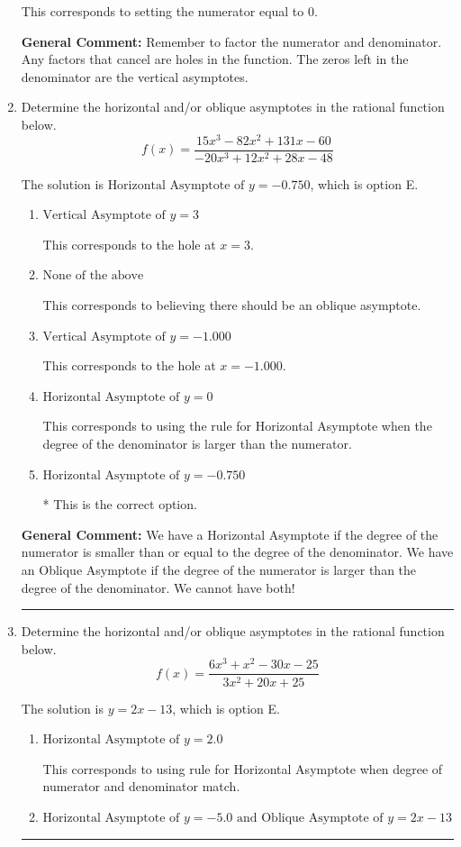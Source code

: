 \documentclass{extbook}[14pt]
\newcommand{\litem}[1]{\item #1

\rule{\textwidth}{0.4pt}}
\begin{document}
\begin{enumerate}
{\begin{enumerate}[label=\Alph*.]
This corresponds to setting the numerator equal to 0.
\end{enumerate}

\textbf{General Comment:} Remember to factor the numerator and denominator. Any factors that cancel are holes in the function. The zeros left in the denominator are the vertical asymptotes.
}
\litem{
Determine the horizontal and/or oblique asymptotes in the rational function below.
\[ f(x) = \frac{15x^{3} -82 x^{2} +131 x -60}{-20x^{3} +12 x^{2} +28 x -48} \]

The solution is \( \text{Horizontal Asymptote of } y = -0.750  \), which is option E.\begin{enumerate}[label=\Alph*.]
\item \( \text{Vertical Asymptote of } y = 3  \)

This corresponds to the hole at $x = 3$.
\item \( \text{None of the above} \)

This corresponds to believing there should be an oblique asymptote.
\item \( \text{Vertical Asymptote of } y = -1.000  \)

This corresponds to the hole at $x = -1.000$.
\item \( \text{Horizontal Asymptote of } y = 0  \)

This corresponds to using the rule for Horizontal Asymptote when the degree of the denominator is larger than the numerator.
\item \( \text{Horizontal Asymptote of } y = -0.750  \)

* This is the correct option.
\end{enumerate}

\textbf{General Comment:} We have a Horizontal Asymptote if the degree of the numerator is smaller than or equal to the degree of the denominator. We have an Oblique Asymptote if the degree of the numerator is larger than the degree of the denominator. We cannot have both!
}
\litem{
Determine the horizontal and/or oblique asymptotes in the rational function below.
\[ f(x) = \frac{6x^{3} + x^{2} -30 x -25}{3x^{2} +20 x + 25} \]

The solution is \( y = 2x -13 \), which is option E.\begin{enumerate}[label=\Alph*.]
\item \( \text{Horizontal Asymptote of } y = 2.0  \)

This corresponds to using rule for Horizontal Asymptote when degree of numerator and denominator match.
\item \( \text{Horizontal Asymptote of } y = -5.0 \text{ and Oblique Asymptote of } y = 2x -13 \)


\end{enumerate}}
\end{enumerate}
\end{document}
